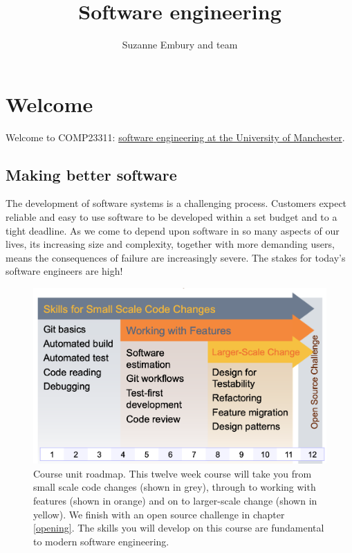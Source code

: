 \documentclass[
]{book}
\title{Software engineering}
\author{Suzanne Embury and team}
\date{}
\begin{document}
\maketitle

{
\setcounter{tocdepth}{1}
\tableofcontents
}
\hypertarget{welcome}{%
\chapter*{Welcome}\label{welcome}}

Welcome to COMP23311: \href{https://studentnet.cs.manchester.ac.uk/ugt/COMP23311/syllabus/}{software engineering at the University of Manchester}.

\hypertarget{better}{%
\section{Making better software}\label{better}}

The development of software systems is a challenging process. Customers expect reliable and easy to use software to be developed within a set budget and to a tight deadline. As we come to depend upon software in so many aspects of our lives, its increasing size and complexity, together with more demanding users, means the consequences of failure are increasingly severe. The stakes for today's software engineers are high!

\begin{figure}

{\centering \includegraphics[width=1\linewidth]{images/course-overview} 

}

\caption{Course unit roadmap. This twelve week course will take you from small scale code changes (shown in grey), through to working with features (shown in orange) and on to larger-scale change (shown in yellow). We finish with an open source challenge in chapter \ref{opening}. The skills you will develop on this course are fundamental to modern software engineering.}\label{fig:course-overview-fig}
\end{figure}
\end{document}
